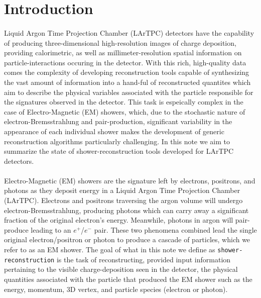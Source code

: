 
\section{Introduction}

\paragraph{}Liquid Argon Time Projection Chamber (LArTPC) detectors have the capability of producing three-dimensional high-resolution images of charge deposition, providing calorimetric, as well as millimeter-resolution spatial information on particle-interactions occuring in the detector. With this rich, high-quality data comes the complexity of developing reconstruction tools capable of synthesizing the vast amount of information into a hand-ful of reconstructed quantites which aim to describe the physical variables associated with the particle responsible for the signatures observed in the detector. This task is espeically complex in the case of Electro-Magnetic (EM) showers, which, due to the stochastic nature of electron-Bremsstrahlung and pair-production, significant variability in the appearance of each individual shower makes the development of generic reconstruction algorithms particularly challenging. In this note we aim to summarize the state of shower-reconstruction tools developed for LArTPC detectors.
\paragraph{}Electro-Magnetic (EM) showers are the signature left by electrons, positrons, and photons as they deposit energy in a Liquid Argon Time Projection Chamber (LArTPC). Electrons and positrons traversing the argon volume will undergo electron-Bremsstrahlung, producing photons which can carry away a significant fraction of the original electron's energy. Meanwhile, photons in argon will pair-produce leading to an $e^+$/$e^-$ pair. These two phenomena combined lead the single original electron/positron or photon to produce a cascade of particles, which we refer to as an EM shower. The goal of what in this note we define as \texttt{shower-reconstruction} is the task of reconstructing, provided input information pertaining to the visible charge-deposition seen in the detector, the physical quantities associated with the particle that produced the EM shower such as the energy, momentum, 3D vertex, and particle species (electron or photon).
